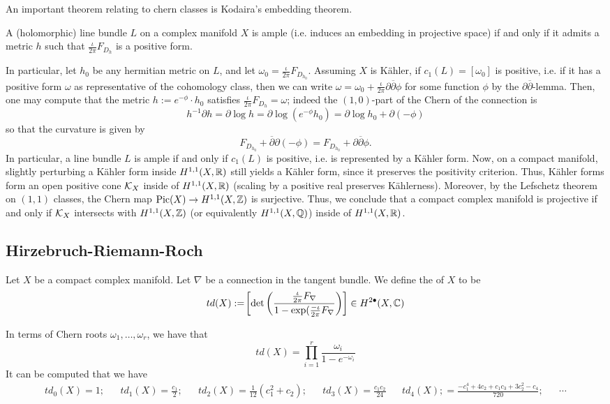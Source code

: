 An important theorem relating to chern classes is Kodaira's embedding theorem.
\begin{theorem}
	A (holomorphic) line bundle $L$ on a complex manifold $X$ is ample (i.e. induces an embedding in projective space) if and only if it admits a metric $h$ such that $\frac{\iota}{2\pi}F_{D_h}$ is a positive form.
\end{theorem}
In particular, let $h_0$ be any hermitian metric on $L$, and let $\omega_0=\frac{\iota}{2\pi}F_{D_{h_0}}$. Assuming $X$ is Kähler, if $c_1(L)=[\omega_0]$ is positive, i.e. if it has a positive form $\omega$ as representative of the cohomology class, then we can write $\omega=\omega_0+\frac{\iota}{2\pi}\partial\overline\partial\phi$ for some function $\phi$ by the $\partial\overline\partial$-lemma. Then, one may compute that the metric $h:=e^{-\phi}\cdot h_0$ satisfies $\frac{\iota}{2\pi}F_{D_h}=\omega$; indeed the $(1,0)$-part of the Chern of the connection is
\[
h^{-1}\partial h=\partial\log h=\partial\log (e^{-\phi}h_0)=\partial\log h_0+\partial (-\phi)
\]
so that the curvature is given by
\[F_{D_{h_0}}+\overline\partial\partial(-\phi)=F_{D_{h_0}}+\partial\overline\partial\phi.
\]
In particular, a line bundle $L$ is ample if and only if $c_1(L)$ is positive, i.e. is represented by a Kähler form. Now, on a compact manifold, slightly perturbing a Kähler form inside $H^{1,1}(X,\mathbb R)$ still yields a Kähler form, since it preserves the positivity criterion. Thus, Kähler forms form an open positive cone $\mathcal{K}_X$ inside of $H^{1,1}(X,\mathbb R)$ (scaling by a positive real preserves Kählerness). Moreover, by the Lefschetz theorem on $(1,1)$ classes, the Chern map $\text{Pic}(X) \to H^{1,1}(X,\mathbb Z)$ is surjective.  Thus, we conclude that a compact complex manifold is projective if and only if $\mathcal{K}_X$ intersects with $H^{1,1}(X,\mathbb Z)$ (or equivalently $H^{1,1}(X,\mathbb{Q})$) inside of $H^{1,1}(X,\mathbb R)$.
\subsection{Hirzebruch-Riemann-Roch}
\begin{definition}
	Let $X$ be a compact complex manifold. Let $\nabla$ be a connection in the tangent bundle. We define the  of $X$ to be
	\[
	td(X):=\!\left[\det\left(\frac{\frac{\iota}{2\pi}F_\nabla}{1-\exp(\frac{-\iota}{2\pi}F_\nabla}\right)\right]\in H^{2\bullet}(X,\mathbb C)
	\]
\end{definition}
In terms of Chern roots $\omega_1,\dots,\omega_r$, we have that
\[
td(X)=\prod_{i=1}^r\frac{\omega_i}{1-e^{-{\omega_i}}}\]
It can be computed that we have
\begin{align*}
	td_0(X)=1;&&td_1(X)=\frac{c_1}{2};&&td_2(X)=\frac{1}{12}(c_1^2+c_2);&& td_3(X)=\frac{c_1c_2}{24}&&td_4(X);=\frac{-c_1^4+4c_2+c_1c_3+3c_2^2-c_4}{720};&&\cdots
\end{align*}

